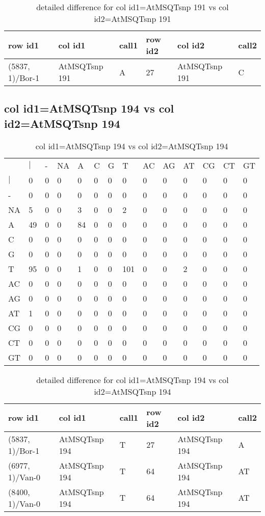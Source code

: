 \begin{center}
\begin{longtable}{|l|l|l|l|l|l|}
\caption{detailed difference for col id1=AtMSQTsnp 191 vs col id2=AtMSQTsnp 191} \label{table_dm765}\\
\hline
row id1&col id1&call1&row id2&col id2&call2\\
\hline
(5837, 1)/Bor-1&AtMSQTsnp 191&A&27&AtMSQTsnp 191&C\\
\hline
\end{longtable}
\end{center}

\subsection{col id1=AtMSQTsnp 194 vs col id2=AtMSQTsnp 194}
\begin{center}
\begin{longtable}{|l|l|l|l|l|l|l|l|l|l|l|l|l|l|}
\caption{col id1=AtMSQTsnp 194 vs col id2=AtMSQTsnp 194} \label{table_dm766}\\
\hline
\\
\hline
&$|$&-&NA&A&C&G&T&AC&AG&AT&CG&CT&GT\\
$|$&0&0&0&0&0&0&0&0&0&0&0&0&0\\
-&0&0&0&0&0&0&0&0&0&0&0&0&0\\
NA&5&0&0&3&0&0&2&0&0&0&0&0&0\\
A&49&0&0&84&0&0&0&0&0&0&0&0&0\\
C&0&0&0&0&0&0&0&0&0&0&0&0&0\\
G&0&0&0&0&0&0&0&0&0&0&0&0&0\\
T&95&0&0&1&0&0&101&0&0&2&0&0&0\\
AC&0&0&0&0&0&0&0&0&0&0&0&0&0\\
AG&0&0&0&0&0&0&0&0&0&0&0&0&0\\
AT&1&0&0&0&0&0&0&0&0&0&0&0&0\\
CG&0&0&0&0&0&0&0&0&0&0&0&0&0\\
CT&0&0&0&0&0&0&0&0&0&0&0&0&0\\
GT&0&0&0&0&0&0&0&0&0&0&0&0&0\\
\hline
\end{longtable}
\end{center}

\begin{center}
\begin{longtable}{|l|l|l|l|l|l|}
\caption{detailed difference for col id1=AtMSQTsnp 194 vs col id2=AtMSQTsnp 194} \label{table_dm767}\\
\hline
row id1&col id1&call1&row id2&col id2&call2\\
\hline
(5837, 1)/Bor-1&AtMSQTsnp 194&T&27&AtMSQTsnp 194&A\\
(6977, 1)/Van-0&AtMSQTsnp 194&T&64&AtMSQTsnp 194&AT\\
(8400, 1)/Van-0&AtMSQTsnp 194&T&64&AtMSQTsnp 194&AT\\
\hline
\end{longtable}
\end{center}

